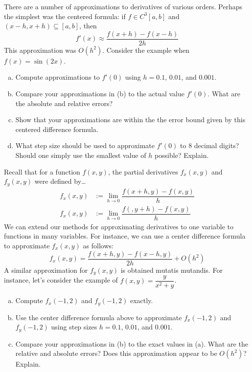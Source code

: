\documentclass[11pt,letterpaper]{article}
\begin{document}


 There are a number of approximations to derivatives of various orders. Perhaps the simplest was the centered formula: if $f \in C^3[a, b]$ and $(x - h, x + h) \subseteq [a, b]$, then
	\[
	f'(x) \approx \dfrac{f(x + h) - f(x - h)}{2h}
	\]
This approximation was $O(h^2)$. Consider the example when $f(x)= \sin(2x)$. 
	\begin{enumerate}[(a)]
	\item Compute approximations to $f'(0)$ using $h= 0.1$, $0.01$, and $0.001$. 
	\item Compare your approximations in (b) to the actual value $f'(0)$. What are the absolute and relative errors? 
	\item Show that your approximations are within the the error bound given by this centered difference formula. 
	\item What step size should be used to approximate $f'(0)$ to 8 decimal digits? Should one simply use the smallest value of $h$ possible? Explain. 
	\end{enumerate}



\newpage



 Recall that for a function $f(x, y)$, the partial derivatives $f_x(x, y)$ and $f_y(x, y)$ were defined by\dots
	\[
	\begin{aligned}
	f_x(x, y)&:= \lim_{h \to 0} \dfrac{f(x + h, y) - f(x, y)}{h} \\
	f_x(x, y)&:= \lim_{h \to 0} \dfrac{f(, y + h) - f(x, y)}{h} 
	\end{aligned}
	\]
We can extend our methods for approximating derivatives to one variable to functions in many variables. For instance, we can use a center difference formula to approximate $f_x(x, y)$ as follows:
	\[
	f_x(x, y)= \dfrac{f(x + h, y) - f(x - h, y)}{2h} + O(h^2)
	\]
A similar approximation for $f_y(x, y)$ is obtained mutatis mutandis. For instance, let's consider the example of $f(x, y)= \dfrac{y}{x^2 + y}$. 
	\begin{enumerate}[(a)]
	\item Compute $f_x(-1, 2)$ and $f_y(-1, 2)$ exactly. 
	\item Use the center difference formula above to approximate $f_x(-1, 2)$ and $f_y(-1, 2)$ using step sizes $h= 0.1$, $0.01$, and $0.001$. 
	\item Compare your approximations in (b) to the exact values in (a). What are the relative and absolute errors? Does this approximation appear to be $O(h^2)$? Explain. 
	\end{enumerate}
\end{document}
